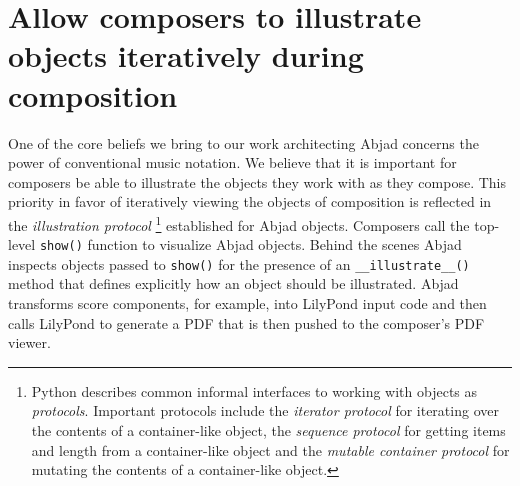 \documentclass{article}
\begin{document}
\section{Allow composers to illustrate objects iteratively during composition }

One of the core beliefs we bring to our work architecting Abjad concerns the
power of conventional music notation. We believe that it is important for
composers be able to illustrate the objects they work with as they compose.
This priority in favor of iteratively viewing the objects of composition is
reflected in the \emph{illustration protocol} \footnote{Python describes common
informal interfaces to working with objects as \emph{protocols}. Important
protocols include the \emph{iterator protocol} for iterating over the contents
of a container-like object, the \emph{sequence protocol} for getting items and
length from a container-like object and the \emph{mutable container protocol}
for mutating the contents of a container-like object.} established for Abjad
objects. Composers call the top-level \texttt{show()} function to visualize
Abjad objects. Behind the scenes Abjad inspects objects passed to
\texttt{show()} for the presence of an \texttt{\_\_illustrate\_\_()} method
that defines explicitly how an object should be illustrated. Abjad transforms
score components, for example, into LilyPond input code and then calls LilyPond
to generate a PDF that is then pushed to the composer's PDF viewer.


\end{document}
